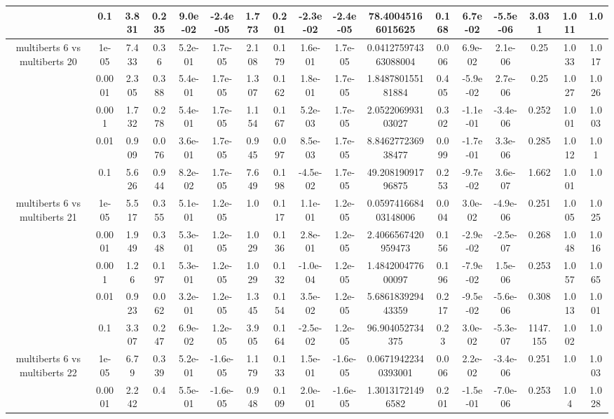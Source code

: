 \begin{tabular}{|c|c|c|c|c|c|c|c|c|c|c|c|c|c|c|c|c|}
 & 0.1 & 3.831 & 0.235 & 9.0e-02 & -2.4e-05 & 1.773 & 0.201 & -2.3e-02 & -2.4e-05 & 78.40045166015625 & 0.168 & 6.7e-02 & -5.5e-06 & 3.031 & 1.011 & 1.0 \\
\hline
\multirow{5}{*}{multiberts 6 vs multiberts 20} & 1e-05 & 7.433 & 0.36 & 5.2e-01 & 1.7e-05 & 2.108 & 0.179 & 1.6e-01 & 1.7e-05 & 0.041275974363088004 & 0.006 & 6.9e-02 & 2.1e-06 & 0.25 & 1.033 & 1.017 \\
 & 0.0001 & 2.305 & 0.388 & 5.4e-01 & 1.7e-05 & 1.307 & 0.162 & 1.8e-01 & 1.7e-05 & 1.848780155181884 & 0.405 & -5.9e-02 & 2.7e-06 & 0.25 & 1.027 & 1.026 \\
 & 0.001 & 1.732 & 0.278 & 5.4e-01 & 1.7e-05 & 1.154 & 0.167 & 5.2e-03 & 1.7e-05 & 2.052206993103027 & 0.302 & -1.1e-01 & -3.4e-06 & 0.252 & 1.001 & 1.003 \\
 & 0.01 & 0.909 & 0.076 & 3.6e-01 & 1.7e-05 & 0.945 & 0.097 & 8.5e-03 & 1.7e-05 & 8.846277236938477 & 0.099 & -1.7e-01 & 3.3e-06 & 0.285 & 1.012 & 1.01 \\
 & 0.1 & 5.626 & 0.944 & 8.2e-02 & 1.7e-05 & 7.649 & 0.198 & -4.5e-02 & 1.7e-05 & 49.20819091796875 & 0.253 & -9.7e-02 & 3.6e-07 & 1.662 & 1.001 & 1.0 \\
\hline
\multirow{5}{*}{multiberts 6 vs multiberts 21} & 1e-05 & 5.517 & 0.355 & 5.1e-01 & 1.2e-05 & 1.0 & 0.117 & 1.1e-01 & 1.2e-05 & 0.059741668403148006 & 0.004 & 3.0e-02 & -4.9e-06 & 0.251 & 1.005 & 1.025 \\
 & 0.0001 & 1.949 & 0.348 & 5.3e-01 & 1.2e-05 & 1.029 & 0.136 & 2.8e-01 & 1.2e-05 & 2.4066567420959473 & 0.156 & -2.9e-02 & -2.5e-07 & 0.268 & 1.048 & 1.016 \\
 & 0.001 & 1.26 & 0.197 & 5.3e-01 & 1.2e-05 & 1.029 & 0.132 & -1.0e-04 & 1.2e-05 & 1.484200477600097 & 0.196 & -7.9e-02 & 1.5e-06 & 0.253 & 1.057 & 1.065 \\
 & 0.01 & 0.923 & 0.062 & 3.2e-01 & 1.2e-05 & 1.345 & 0.154 & 3.5e-02 & 1.2e-05 & 5.686183929443359 & 0.217 & -9.5e-02 & -5.6e-06 & 0.308 & 1.013 & 1.001 \\
 & 0.1 & 3.307 & 0.247 & 6.9e-02 & 1.2e-05 & 3.905 & 0.164 & -2.5e-02 & 1.2e-05 & 96.904052734375 & 0.23 & 3.0e-02 & -5.3e-07 & 1147.155 & 1.002 & 1.0 \\
\hline
\multirow{5}{*}{multiberts 6 vs multiberts 22} & 1e-05 & 6.79 & 0.339 & 5.2e-01 & -1.6e-05 & 1.179 & 0.133 & 1.5e-01 & -1.6e-05 & 0.06719422340393001 & 0.006 & 2.2e-02 & -3.4e-06 & 0.251 & 1.0 & 1.003 \\
 & 0.0001 & 2.242 & 0.4 & 5.5e-01 & -1.6e-05 & 0.948 & 0.109 & 2.0e-01 & -1.6e-05 & 1.30131721496582 & 0.201 & -1.5e-01 & -7.0e-06 & 0.253 & 1.04 & 1.028 \\

\end{tabular}
